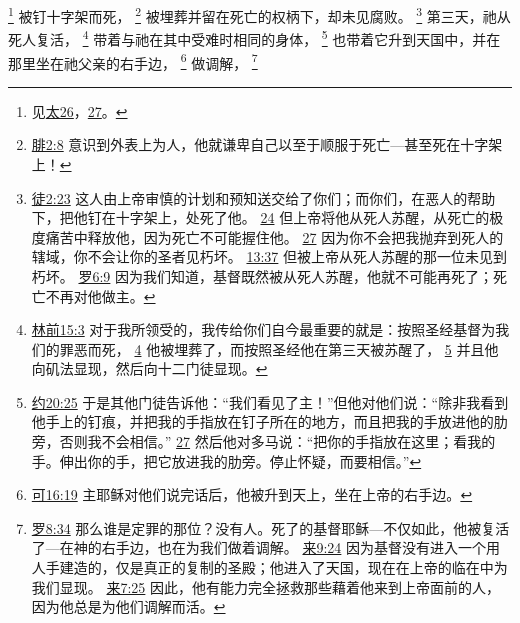 \documentclass[12pt, a4paper, oneside]{ctexart}
\begin{document}
	\footnote {
		见\href{https://biblehub.com/niv/matthew/26.htm}{太26}，\href{https://biblehub.com/niv/matthew/26.htm}{27}。
	}
	被钉十字架而死，
	\footnote {
		\href{https://biblehub.com/philippians/2-8.htm}{腓2:8} 意识到外表上为人，他就谦卑自己以至于顺服于死亡---甚至死在十字架上！
	}
	被埋葬并留在死亡的权柄下，却未见腐败。
	\footnote {
		\href{https://biblehub.com/acts/2-23.htm}{徒2:23} 这人由上帝审慎的计划和预知送交给了你们；而你们，在恶人的帮助下，把他钉在十字架上，处死了他。
		\href{https://biblehub.com/acts/2-24.htm}{24} 但上帝将他从死人苏醒，从死亡的极度痛苦中释放他，因为死亡不可能握住他。
		\href{https://biblehub.com/acts/2-27.htm}{27} 因为你不会把我抛弃到死人的辖域，你不会让你的圣者见朽坏。
		\href{https://biblehub.com/acts/13-37.htm}{13:37} 但被上帝从死人苏醒的那一位未见到朽坏。
		\href{https://biblehub.com/romans/6-9.htm}{罗6:9} 因为我们知道，基督既然被从死人苏醒，他就不可能再死了；死亡不再对他做主。
	}
	第三天，祂从死人复活，
	\footnote {
		\href{https://biblehub.com/1_corinthians/15-3.htm}{林前15:3} 对于我所领受的，我传给你们自今最重要的就是：按照圣经基督为我们的罪恶而死，
		\href{https://biblehub.com/1_corinthians/15-4.htm}{4} 他被埋葬了，而按照圣经他在第三天被苏醒了，
		\href{https://biblehub.com/1_corinthians/15-5.htm}{5} 并且他向矶法显现，然后向十二门徒显现。
	}
	带着与祂在其中受难时相同的身体，
	\footnote {
		\href{https://biblehub.com/john/20-25.htm}{约20:25} 于是其他门徒告诉他：“我们看见了主！”但他对他们说：“除非我看到他手上的钉痕，并把我的手指放在钉子所在的地方，而且把我的手放进他的肋旁，否则我不会相信。”
		\href{https://biblehub.com/john/20-27.htm}{27} 然后他对多马说：“把你的手指放在这里；看我的手。伸出你的手，把它放进我的肋旁。停止怀疑，而要相信。”
	}
	也带着它升到天国中，并在那里坐在祂父亲的右手边，
	\footnote {
		\href{https://biblehub.com/mark/16-19.htm}{可16:19} 主耶稣对他们说完话后，他被升到天上，坐在上帝的右手边。
	}
	做调解，
	\footnote {
		\href{https://biblehub.com/romans/8-34.htm}{罗8:34} 那么谁是定罪的那位？没有人。死了的基督耶稣---不仅如此，他被复活了---在神的右手边，也在为我们做着调解。
		\href{https://biblehub.com/hebrews/9-24.htm}{来9:24} 因为基督没有进入一个用人手建造的，仅是真正的复制的圣殿；他进入了天国，现在在上帝的临在中为我们显现。
		\href{https://biblehub.com/hebrews/7-25.htm}{来7:25} 因此，他有能力完全拯救那些藉着他来到上帝面前的人，因为他总是为他们调解而活。
	}
\end{document}

